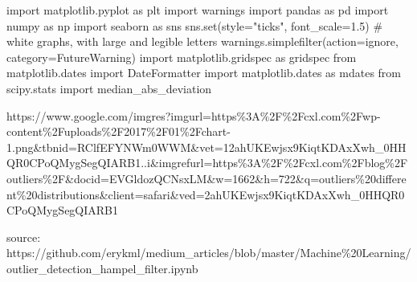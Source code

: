 \documentclass[
  letterpaper,
  DIV=11,
  numbers=noendperiod,
  oneside]{scrreprt}
\newenvironment{Shaded}{\begin{snugshade}}{\end{snugshade}}
\newcommand{\BuiltInTok}[1]{\textcolor[rgb]{0.00,0.23,0.31}{#1}}
\newcommand{\CommentTok}[1]{\textcolor[rgb]{0.37,0.37,0.37}{#1}}
\newcommand{\FloatTok}[1]{\textcolor[rgb]{0.68,0.00,0.00}{#1}}
\newcommand{\ImportTok}[1]{\textcolor[rgb]{0.00,0.46,0.62}{#1}}
\newcommand{\NormalTok}[1]{\textcolor[rgb]{0.00,0.23,0.31}{#1}}
\newcommand{\OperatorTok}[1]{\textcolor[rgb]{0.37,0.37,0.37}{#1}}
\newcommand{\PreprocessorTok}[1]{\textcolor[rgb]{0.68,0.00,0.00}{#1}}
\newcommand{\StringTok}[1]{\textcolor[rgb]{0.13,0.47,0.30}{#1}}
\begin{document}
\begin{Shaded}
\begin{Highlighting}[]
\ImportTok{import}\NormalTok{ matplotlib.pyplot }\ImportTok{as}\NormalTok{ plt}
\ImportTok{import}\NormalTok{ warnings}
\ImportTok{import}\NormalTok{ pandas }\ImportTok{as}\NormalTok{ pd}
\ImportTok{import}\NormalTok{ numpy }\ImportTok{as}\NormalTok{ np }
\ImportTok{import}\NormalTok{ seaborn }\ImportTok{as}\NormalTok{ sns}
\NormalTok{sns.}\BuiltInTok{set}\NormalTok{(style}\OperatorTok{=}\StringTok{"ticks"}\NormalTok{, font\_scale}\OperatorTok{=}\FloatTok{1.5}\NormalTok{)  }\CommentTok{\# white graphs, with large and legible letters}
\NormalTok{warnings.simplefilter(action}\OperatorTok{=}\StringTok{\textquotesingle{}ignore\textquotesingle{}}\NormalTok{, category}\OperatorTok{=}\PreprocessorTok{FutureWarning}\NormalTok{)}
\ImportTok{import}\NormalTok{ matplotlib.gridspec }\ImportTok{as}\NormalTok{ gridspec}
\ImportTok{from}\NormalTok{ matplotlib.dates }\ImportTok{import}\NormalTok{ DateFormatter}
\ImportTok{import}\NormalTok{ matplotlib.dates }\ImportTok{as}\NormalTok{ mdates}
\ImportTok{from}\NormalTok{ scipy.stats }\ImportTok{import}\NormalTok{ median\_abs\_deviation}
\end{Highlighting}
\end{Shaded}

https://www.google.com/imgres?imgurl=https\%3A\%2F\%2Fcxl.com\%2Fwp-content\%2Fuploads\%2F2017\%2F01\%2Fchart-1.png\&tbnid=RClfEFYNWm0WWM\&vet=12ahUKEwjsx9KiqtKDAxXwh\_0HHQR0CPoQMygSegQIARB1..i\&imgrefurl=https\%3A\%2F\%2Fcxl.com\%2Fblog\%2Foutliers\%2F\&docid=EVGldozQCNsxLM\&w=1662\&h=722\&q=outliers\%20different\%20distributions\&client=safari\&ved=2ahUKEwjsx9KiqtKDAxXwh\_0HHQR0CPoQMygSegQIARB1

source:
https://github.com/erykml/medium\_articles/blob/master/Machine\%20Learning/outlier\_detection\_hampel\_filter.ipynb
\end{document}
